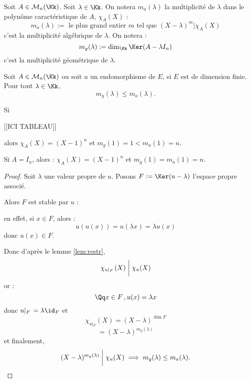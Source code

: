 \documentclass[class=report,crop=false]{standalone}
\newcommand{\Res}[1]{{\left | {}_{#1} \right.}}
\begin{document}
\begin{definition}
Soit $A\in \mathcal{M}_n(\Kk)$. Soit $\lambda \in \Kk$. On notera $m_a(\lambda)$ la multiplicité de $\lambda$ dans le polynôme caractéristique de $A$, $\chi_A(X)$ : \[m_a(\lambda) := \mbox{  le plus grand entier $m$ tel que $(X-\lambda)^m | \chi_A(X)$}\]c'est la multiplicité algébrique  de $\lambda$. On notera  :
\[ m_g(\lambda) := \dim_\Kk \Ker(A-\lambda I_n)\]  c'est la multiplicité géométrique  de $\lambda$.
\end{definition}

\begin{corollaire}
Soit $A \in \mathcal{M}_n(\Kk)$ ou soit $u$ un endomorphisme de $E$, si $E$ est de dimension finie. Pour tout $\lambda \in \Kk$,
\[m_g(\lambda) \le m_a(\lambda).\] 
\end{corollaire}

\begin{exemple}
Si 

[[ICI TABLEAU]]



alors $\chi_A(X) = (X-1)^n$ et $m_g(1)=1 < m_a(1)=n$. 

Si $A= I_n$, alors :
$\chi_A(X) = (X-1)^n$ et $m_g(1)=m_a(1)=n$.

\end{exemple}

\begin{proof}
Soit $\lambda$ une valeur propre de $u$. Posons $F:=\Ker (u-\lambda)$ l'espace propre associé.

Alors $F$ est stable par $u$ :

en effet, si $x \in F$, alors :
\[u(u(x)) = u(\lambda x) = \lambda u(x)\]
donc $u(x) \in F$.

Donc d'après le lemme \ref{lem:restr},
\[\chi_{u\Res{F}}(X) \biggm | \chi_u(X)\]
or :
\[\Qq x \in F\,, u(x) = \lambda x\]
donc $u\Res{F} = \lambda \id_F$ et \[\chi_{u\Res{F}}(X) = (X-\lambda)^{\dim F}\]
\[= (X-\lambda)^{m_g(\lambda)}\]
et finalement,
\[(X-\lambda)^{m_g(\lambda)} \biggm | \chi_u(X) \implies m_g(\lambda) \le m_a(\lambda) .\] 
\end{proof}
\end{document}
